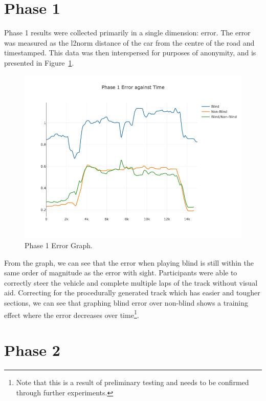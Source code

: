 \documentclass[
hidelinks,
12pt, %
oneside, %
english, %
doublespacing, %
headsepline, %
]{MastersDoctoralThesis} %
\begin{document}
\section{Phase 1}

Phase 1 results were collected primarily in a single dimension: error. The error was measured as the l2norm distance of the car from the centre of the road and timestamped. This data was then interspersed for purposes of anonymity, and is presented in Figure~\ref{fig:p1error}.

\begin{figure}[h]
	\centering\includegraphics[width=1\linewidth]{images/p1error}
	\decoRule
	\caption[Phase 1 Error]{Phase 1 Error Graph.}
	\label{fig:p1error}
\end{figure}

From the graph, we can see that the error when playing blind is still within the same order of magnitude as the error with sight. Participants were able to correctly steer the vehicle and complete multiple laps of the track without visual aid. Correcting for the procedurally generated track which has easier and tougher sections, we can see that graphing blind error over non-blind shows a training effect where the error decreases over time\footnote{Note that this is a result of preliminary testing and needs to be confirmed through further experiments.}.

\section{Phase 2}
\end{document}
